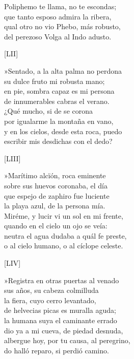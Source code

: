 \documentclass[11pt,a4paper,twoside]{article}
\begin{document}
Poliphemo te llama, no te escondas;\\
que tanto esposo admira la ribera,\\
qual otro no vio Phebo, más robusto,\\
del perezoso Volga al Indo adusto.\par\pend
%
\begin{center}
	[LII]
\end{center}\pstart
»Sentado, a la alta palma no perdona\\
su dulce fruto mi robusta mano;\\
en pie, sombra capaz es mi persona\\
de innumerables cabras el verano.\\
¿Qué mucho, si de  se corona\\
por igualarme la montaña en vano,\\
y en los cielos, desde esta roca, puedo\\
escribir mis desdichas con el dedo?\par\pend
%
\begin{center}
	[LIII]
\end{center}\pstart
»Marítimo alcïón, roca eminente\\
sobre sus huevos coronaba, el día\\
que espejo de zaphiro fue luciente\\
la playa azul, de la persona mía.\\
Miréme, y lucir vi un sol en mi frente,\\
quando en el cielo un ojo se veía:\\
neutra el agua dudaba a quál fe preste,\\
o al cielo humano, o al cíclope celeste.\par\pend
%
\begin{center}
	[LIV]
\end{center}\pstart
»Registra en otras puertas al venado\\
sus años, su cabeza colmilluda\\
la fiera, cuyo cerro levantado,\\
de helvecias picas es muralla aguda;\\
la humana suya el caminante errado\\
dio ya a mi cueva, de piedad desnuda,\\
albergue hoy, por tu causa, al peregrino,\\
do halló reparo, si perdió camino.\par\pend
\end{document}
